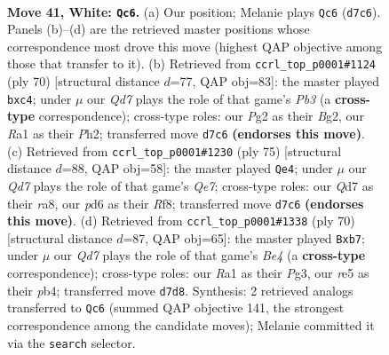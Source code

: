 \documentclass[11pt]{article}
\begin{document}
\clearpage

\begin{figure}[p]\centering
\begin{subfigure}{0.46\textwidth}\centering
\resizebox{\linewidth}{!}{%
\newchessgame
\chessboard[
  setfen={1r6/2RQ4/p2p1kp1/3qrn1p/1p5P/4p3/4NPP1/R4K2 w - - 0 41},
  showmover=false,
  pgfstyle=straightmove, color=movearrow, markmove={d7-c6}
]}
\caption{}
\end{subfigure}\hfill
\begin{subfigure}{0.46\textwidth}\centering
\resizebox{\linewidth}{!}{%
\newchessgame
\chessboard[
  setfen={3rqk2/1p3p2/p3r3/P2pn1R1/2pQ2P1/1P6/3R2BP/7K w - - 1 36},
  showmover=false,
  pgfstyle=straightmove, color=movearrow, markmove={b3-c4}
]}
\caption{}
\end{subfigure}
\\[4pt]
\begin{subfigure}{0.46\textwidth}\centering
\resizebox{\linewidth}{!}{%
\newchessgame
\chessboard[
  setfen={R4rk1/5pb1/6p1/3p3p/1P1P1Q1N/6PP/1r2q1PK/R7 b - - 14 38},
  showmover=false,
  pgfstyle=straightmove, color=movearrow, markmove={e2-e4}
]}
\caption{}
\end{subfigure}\hfill
\begin{subfigure}{0.46\textwidth}\centering
\resizebox{\linewidth}{!}{%
\newchessgame
\chessboard[
  setfen={8/1r1q1pk1/5np1/p6p/1pp1B2P/1P4P1/5PK1/Q3R3 w - - 2 36},
  showmover=false,
  pgfstyle=straightmove, color=movearrow, markmove={e4-b7}
]}
\caption{}
\end{subfigure}
\caption{\textbf{Move 41, White: \texttt{Qc6}.} (a) Our position; Melanie plays \texttt{Qc6} (\texttt{d7c6}). Panels (b)--(d) are the retrieved master positions whose correspondence most drove this move (highest QAP objective among those that transfer to it). (b) Retrieved from \texttt{ccrl\_top\_p0001\#1124} (ply 70) [structural distance $d$=77, QAP obj=83]: the master played \texttt{bxc4}; under $\mu$ our \emph{Qd7} plays the role of that game's \emph{Pb3} (a \textbf{cross-type} correspondence); cross-type roles: our \emph{P}g2 as their \emph{B}g2, our \emph{R}a1 as their \emph{P}h2; transferred move \texttt{d7c6} \textbf{(endorses this move)}. (c) Retrieved from \texttt{ccrl\_top\_p0001\#1230} (ply 75) [structural distance $d$=88, QAP obj=58]: the master played \texttt{Qe4}; under $\mu$ our \emph{Qd7} plays the role of that game's \emph{Qe7}; cross-type roles: our \emph{Q}d7 as their \emph{r}a8, our \emph{p}d6 as their \emph{R}f8; transferred move \texttt{d7c6} \textbf{(endorses this move)}. (d) Retrieved from \texttt{ccrl\_top\_p0001\#1338} (ply 70) [structural distance $d$=87, QAP obj=65]: the master played \texttt{Bxb7}; under $\mu$ our \emph{Qd7} plays the role of that game's \emph{Be4} (a \textbf{cross-type} correspondence); cross-type roles: our \emph{R}a1 as their \emph{P}g3, our \emph{r}e5 as their \emph{p}b4; transferred move \texttt{d7d8}. Synthesis: 2 retrieved analogs transferred to \texttt{Qc6} (summed QAP objective 141, the strongest correspondence among the candidate moves); Melanie committed it via the \texttt{search} selector.}
\label{fig:thought-m80}
\end{figure}
\end{document}
